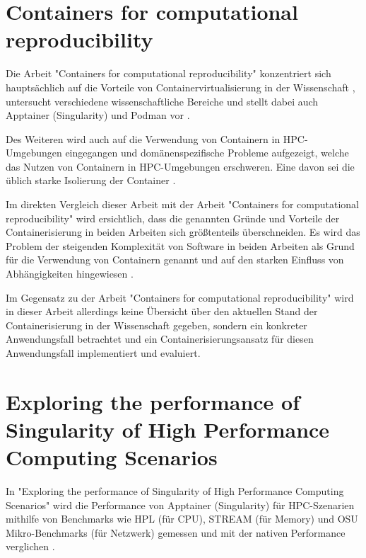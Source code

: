 \section{Containers for computational reproducibility \cite{moreauContainersComputationalReproducibility2023}}

Die Arbeit "Containers for computational reproducibility" \cite{moreauContainersComputationalReproducibility2023} konzentriert sich hauptsächlich auf die Vorteile von Containervirtualisierung in der Wissenschaft \cite[Vgl. S. 4ff]{moreauContainersComputationalReproducibility2023}, untersucht verschiedene wissenschaftliche Bereiche \cite[Vgl. S. 6ff]{moreauContainersComputationalReproducibility2023} und stellt dabei auch Apptainer (Singularity) und Podman vor \cite[Vgl. S. 7]{moreauContainersComputationalReproducibility2023}. 

Des Weiteren wird auch auf die Verwendung von Containern in HPC-Umgebungen eingegangen und domänenspezifische Probleme aufgezeigt, welche das Nutzen von Containern in HPC-Umgebungen erschweren. Eine davon sei die üblich starke Isolierung der Container \cite[Vgl. S. 12f]{moreauContainersComputationalReproducibility2023}.

Im direkten Vergleich dieser Arbeit mit der Arbeit "Containers for computational reproducibility" \cite{moreauContainersComputationalReproducibility2023} wird ersichtlich, dass die genannten Gründe und Vorteile der Containerisierung in beiden Arbeiten sich größtenteils überschneiden. Es wird das Problem der steigenden Komplexität von Software in beiden Arbeiten als Grund für die Verwendung von Containern genannt und auf den starken Einfluss von Abhängigkeiten hingewiesen \cite[Vgl. S. 1f]{moreauContainersComputationalReproducibility2023}. 

Im Gegensatz zu der Arbeit "Containers for computational reproducibility" wird in dieser Arbeit allerdings keine Übersicht über den aktuellen Stand der Containerisierung in der Wissenschaft gegeben, sondern ein konkreter Anwendungsfall betrachtet und ein Containerisierungsansatz für diesen Anwendungsfall implementiert und evaluiert.

\section{Exploring the performance of Singularity of High Performance Computing Scenarios \cite{huExploringPerformanceSingularity2019}}

In "Exploring the performance of Singularity of High Performance Computing Scenarios" \cite{huExploringPerformanceSingularity2019} wird die Performance von Apptainer (Singularity) für HPC-Szenarien mithilfe von Benchmarks wie HPL (für CPU), STREAM (für Memory) und OSU Mikro-Benchmarks (für Netzwerk) gemessen und mit der nativen Performance verglichen \cite[Vgl. S. 2587]{huExploringPerformanceSingularity2019}. 

